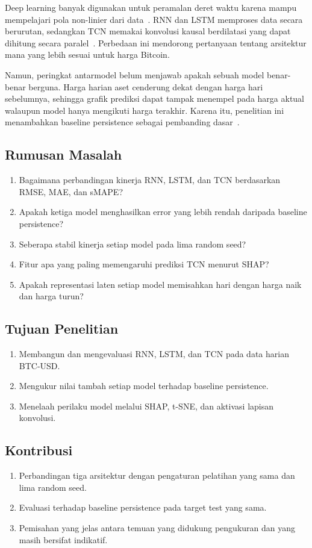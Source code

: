 \documentclass[conference,a4paper]{IEEEtran}
\begin{document}
Deep learning banyak digunakan untuk peramalan deret waktu karena mampu mempelajari pola non-linier dari data~\cite{lim2021}. RNN dan LSTM memproses data secara berurutan, sedangkan TCN memakai konvolusi kausal berdilatasi yang dapat dihitung secara paralel~\cite{bai2018}. Perbedaan ini mendorong pertanyaan tentang arsitektur mana yang lebih sesuai untuk harga Bitcoin.

Namun, peringkat antarmodel belum menjawab apakah sebuah model benar-benar berguna. Harga harian aset cenderung dekat dengan harga hari sebelumnya, sehingga grafik prediksi dapat tampak menempel pada harga aktual walaupun model hanya mengikuti harga terakhir. Karena itu, penelitian ini menambahkan baseline persistence sebagai pembanding dasar~\cite{hyndman2021}.

\subsection{Rumusan Masalah}
\begin{enumerate}
\item Bagaimana perbandingan kinerja RNN, LSTM, dan TCN berdasarkan RMSE, MAE, dan sMAPE?
\item Apakah ketiga model menghasilkan error yang lebih rendah daripada baseline persistence?
\item Seberapa stabil kinerja setiap model pada lima random seed?
\item Fitur apa yang paling memengaruhi prediksi TCN menurut SHAP?
\item Apakah representasi laten setiap model memisahkan hari dengan harga naik dan harga turun?
\end{enumerate}

\subsection{Tujuan Penelitian}
\begin{enumerate}
\item Membangun dan mengevaluasi RNN, LSTM, dan TCN pada data harian BTC-USD.
\item Mengukur nilai tambah setiap model terhadap baseline persistence.
\item Menelaah perilaku model melalui SHAP, t-SNE, dan aktivasi lapisan konvolusi.
\end{enumerate}

\subsection{Kontribusi}
\begin{enumerate}
\item Perbandingan tiga arsitektur dengan pengaturan pelatihan yang sama dan lima random seed.
\item Evaluasi terhadap baseline persistence pada target test yang sama.
\item Pemisahan yang jelas antara temuan yang didukung pengukuran dan yang masih bersifat indikatif.
\end{enumerate}
\end{document}
